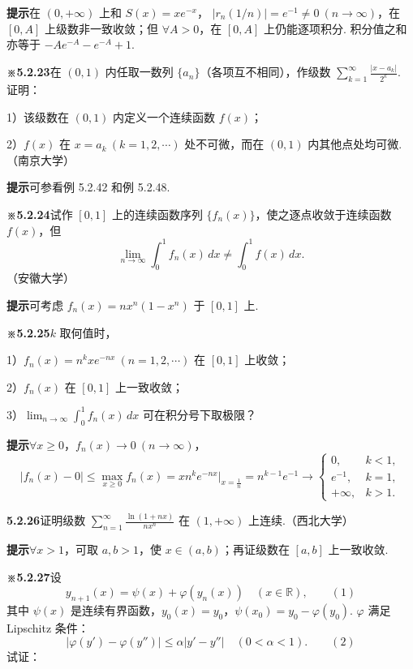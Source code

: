 \documentclass[UTF8, 12pt, fontset=fandol, oneside]{ctexart}
\begin{document}
\noindent\textbf{提示}\quad 在 $(0,+\infty)$ 上和 $S(x)=xe^{-x}$，
$|r_n(1/n)|=e^{-1}\ne0\ (n\to\infty)$，在 $[0,A]$ 上级数非一致收敛；但
$\forall A>0$，在 $[0,A]$ 上仍能逐项积分. 积分值之和亦等于 $-Ae^{-A}-e^{-A}+1$.

\noindent\textbf{※5.2.23}\quad 在 $(0,1)$ 内任取一数列 $\{a_n\}$（各项互不相同），作级数
$\displaystyle\sum_{k=1}^{\infty}\frac{|x-a_k|}{2^k}$. 证明：

1）该级数在 $(0,1)$ 内定义一个连续函数 $f(x)$；

2）$f(x)$ 在 $x=a_k\ (k=1,2,\cdots)$ 处不可微，而在 $(0,1)$ 内其他点处均可微.（南京大学）

\noindent\textbf{提示}\quad 可参看例 5.2.42 和例 5.2.48.

\noindent\textbf{※5.2.24}\quad 试作 $[0,1]$ 上的连续函数序列 $\{f_n(x)\}$，使之逐点收敛于连续函数 $f(x)$，但
\[
  \lim_{n\to\infty}\int_0^1 f_n(x)\,dx\ne\int_0^1f(x)\,dx.
\]
（安徽大学）

\noindent\textbf{提示}\quad 可考虑 $f_n(x)=nx^n(1-x^n)$ 于 $[0,1]$ 上.

\noindent\textbf{※5.2.25}\quad $k$ 取何值时，

1）$f_n(x)=n^kxe^{-nx}\ (n=1,2,\cdots)$ 在 $[0,1]$ 上收敛；

2）$f_n(x)$ 在 $[0,1]$ 上一致收敛；

3）$\displaystyle\lim_{n\to\infty}\int_0^1 f_n(x)\,dx$ 可在积分号下取极限？

\noindent\textbf{提示}\quad $\forall x\ge0$，$f_n(x)\to0\ (n\to\infty)$，
\[
  |f_n(x)-0|\le\max_{x\ge0}f_n(x)
  =xn^ke^{-nx}\bigg|_{x=\frac1n}
  =n^{k-1}e^{-1}\to
  \begin{cases}
    0,&k<1,\\
    e^{-1},&k=1,\\
    +\infty,&k>1.
  \end{cases}
\]

\noindent\textbf{5.2.26}\quad 证明级数
$\displaystyle\sum_{n=1}^{\infty}\frac{\ln(1+nx)}{nx^n}$ 在 $(1,+\infty)$ 上连续.（西北大学）

\noindent\textbf{提示}\quad $\forall x>1$，可取 $a,b>1$，使 $x\in(a,b)$；再证级数在 $[a,b]$ 上一致收敛.

\noindent\textbf{※5.2.27}\quad 设
\[
  y_{n+1}(x)=\psi(x)+\varphi(y_n(x))\quad(x\in\mathbb R),
\qquad(1)
\]
其中 $\psi(x)$ 是连续有界函数，$y_0(x)=y_0$，$\psi(x_0)=y_0-\varphi(y_0)$. $\varphi$ 满足 Lipschitz 条件：
\[
  |\varphi(y')-\varphi(y'')|\le\alpha|y'-y''|\quad(0<\alpha<1).
\qquad(2)
\]
试证：
\end{document}

